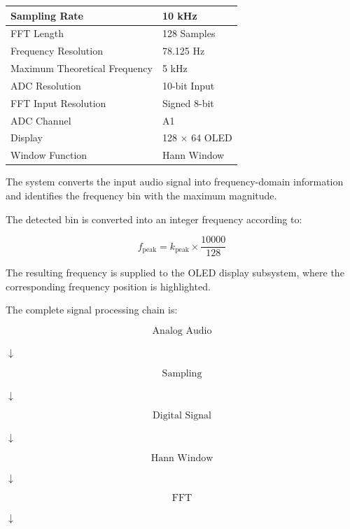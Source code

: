 \documentclass{article}
\begin{document}
\begin{center}
\begin{table}[H]
\begin{tabular}{|p{7cm}|p{5cm}|}
Sampling Rate & 10 kHz \\
\hline

FFT Length & 128 Samples \\
\hline

Frequency Resolution & 78.125 Hz \\
\hline

Maximum Theoretical Frequency & 5 kHz \\
\hline

ADC Resolution & 10-bit Input \\
\hline

FFT Input Resolution & Signed 8-bit \\
\hline

ADC Channel & A1 \\
\hline

Display & 128 $\times$ 64 OLED \\
\hline

Window Function & Hann Window \\
\hline

\end{tabular}
\end{table}

The system converts the input audio signal into frequency-domain information and identifies the frequency bin with the maximum magnitude.

The detected bin is converted into an integer frequency according to:

\[
f_{\text{peak}}
=
k_{\text{peak}}
\times
\frac{10000}{128}
\]

The resulting frequency is supplied to the OLED display subsystem, where the corresponding frequency position is highlighted.

The complete signal processing chain is:

\begin{center}

\[
\boxed{\text{Analog Audio}}
\]

$\downarrow$

\[
\boxed{\text{Sampling}}
\]

$\downarrow$

\[
\boxed{\text{Digital Signal}}
\]

$\downarrow$

\[
\boxed{\text{Hann Window}}
\]

$\downarrow$

\[
\boxed{\text{FFT}}
\]

$\downarrow$


\end{center}
\end{center}
\end{document}
